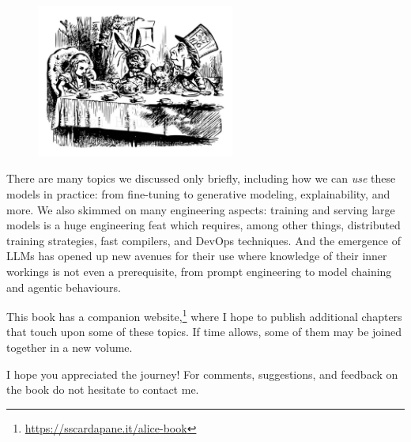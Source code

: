 \documentclass[12pt]{book}
\begin{document}
\begin{figure}
\includegraphics[width=6.5cm]{images/alice_mad_hatter.jpg}
\end{figure} 

There are many topics we discussed only briefly, including how we can \textit{use} these models in practice: from fine-tuning to generative modeling, explainability, and more. We also skimmed on many engineering aspects: training and serving large models is a huge engineering feat which requires, among other things, distributed training strategies, fast compilers, and DevOps techniques. And the emergence of LLMs has opened up new avenues for their use where knowledge of their inner workings is not even a prerequisite, from prompt engineering to model chaining and agentic behaviours.

This book has a companion website,\footnote{\url{https://sscardapane.it/alice-book}} where I hope to publish additional chapters that touch upon some of these topics. If time allows, some of them may be joined together in a new volume.

I hope you appreciated the journey! For comments, suggestions, and feedback on the book do not hesitate to contact me.

\newpage
\pagecolor{white}
\pagestyle{fancy}

\appendix
{}




\footnotesize

\end{document}
